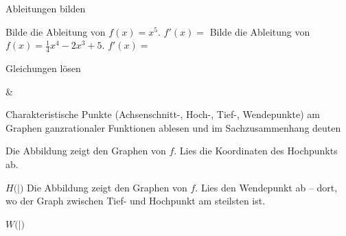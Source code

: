 \setcounter{aufgabe}{0}

\begin{aufgabe}{Ableitungen bilden}
\begin{teile}
\teil Bilde die Ableitung von $f(x) = x^5$. $f'(x) = $ \leerfeld
\teil Bilde die Ableitung von $f(x) = \frac{1}{4}x^4 - 2x^3 + 5$. $f'(x) = $ \leerfeld
\end{teile}
\end{aufgabe}

\begin{aufgabe}{Gleichungen lösen}
\begin{gleichungsraster}[2]
 &
 \\
\end{gleichungsraster}
\end{aufgabe}

\begin{aufgabe}{Charakteristische Punkte (Achsenschnitt-, Hoch-, Tief-, Wendepunkte) am Graphen ganzrationaler Funktionen ablesen und im Sachzusammenhang deuten}
\begin{teile}
\teil Die Abbildung zeigt den Graphen von $f$. Lies die Koordinaten des Hochpunkts ab.

\begin{ksys}[xmin=-3,xmax=3,ymin=-3,ymax=3,ablesen]  \end{ksys}
$H($\leerfeld$|$\leerfeld$)$
\teil Die Abbildung zeigt den Graphen von $f$. Lies den Wendepunkt ab – dort, wo der Graph zwischen Tief- und Hochpunkt am steilsten ist.

\begin{ksys}[xmin=-3,xmax=3,ymin=-3,ymax=3,ablesen]  \end{ksys}
$W($\leerfeld$|$\leerfeld$)$
\end{teile}
\end{aufgabe}

